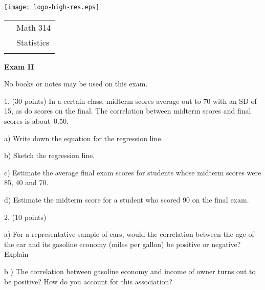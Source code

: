 \documentclass[10pt]{article}
\begin{document}
\pagestyle{empty}

\href{http://www.shepherd.edu}{\texttt{[image: logo-high-res.eps]}}
\vspace{-1.69cm}

{\small
\begin{tabular}{cl}
& Math 314\\
& Statistics\\
\hspace{5.28in} & %
\end{tabular}
}

\begin{center}
\textbf{\large  Exam II}
\end{center}
No books or notes  may be used on this exam.
\medskip

1. (30 points) In a certain class, midterm scores average out to 70 with an SD of 15, as do 
scores on the final.  The correlation between midterm scores and final scores is 
about~$0.50$.   

\hspace{20pt} a) Write down the equation for the regression line. %
\vspace{1.0in}

\hspace{20pt} b) Sketch the regression line. %
\vspace{1.25in}

\hspace{20pt} c) 
Estimate the average final exam scores for students whose midterm scores were
85, 40 and 70. %
\vspace{2.75in}

\hspace{20pt} d) Estimate the midterm score for a student who scored 90 on the final exam.
\vfill
\eject
{\ }


2. (10 points) 

\hspace{20pt} a) For a representative sample of cars, would the correlation between the
age of the car and its gasoline economy (miles per gallon) be positive or negative?  Explain
\vspace{1.5in}

\hspace{20pt} b ) The correlation between gasoline economy and income of owner turns out to 
be positive?  How do you account for this association?
\vspace{1.5in}
\end{document}
